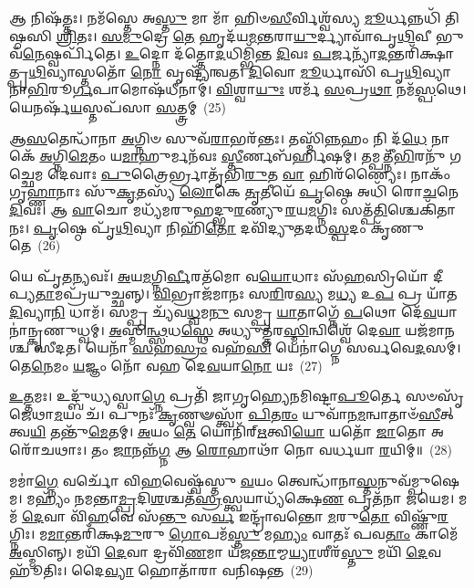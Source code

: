 𑌆 𑌨𑌿𑌷᳴𑌤𑍍𑌤𑌃। 𑌨𑌮᳴𑌸𑍍𑌤𑍇 𑌅\-\ul{𑌸𑍍𑌤𑍁} 𑌮𑌾 𑌮𑌾᳴ 𑌹𑌿𑍞\-\ul{𑌸𑍀}\-𑌰𑍍𑌵𑌿𑌶𑍍𑌵᳴𑌸𑍍𑌯 \ul{𑌮𑍂}\-𑌰𑍍𑌧𑌨𑍍𑌨𑌧𑌿᳴ 𑌤𑌿𑌷𑍍𑌠𑌸𑌿 \ul{𑌶𑍍𑌰𑌿}\-𑌤𑌃। \ul{𑌸}\-\-\ul{𑌮𑍁}\-𑌦𑍍𑌰𑍇 \ul{𑌤𑍇} 𑌹𑍃𑌦᳴𑌯\-\ul{𑌮}\-𑌨𑍍𑌤𑌰𑌾\-\ul{𑌯𑍁}\-𑌰𑍍𑌦𑍍𑌯𑌾𑌵𑌾᳴𑌪𑍃\-\ul{𑌥𑌿}\-𑌵𑍀 𑌭𑍁𑌵᳴\-\ul{𑌨𑍇}\-𑌷𑍍𑌵𑌰𑍍𑌪𑌿᳴𑌤𑍇। \ul{𑌉}\-𑌦𑍍𑌨𑍋 𑌦᳴𑌤𑍍𑌤𑍋\-\ul{𑌦}\-𑌧𑌿𑌮𑍍𑌭𑌿᳴𑌨𑍍𑌤 \ul{𑌦𑌿}\-𑌵𑌃 \ul{𑌪}\-𑌰𑍍𑌜𑌨𑍍𑌯𑌾᳴\-\ul{𑌦}\-𑌨𑍍𑌤𑌰𑌿᳴𑌕𑍍𑌷𑌾𑌤𑍍𑌪𑍃\-\ul{𑌥𑌿}\-𑌵𑍍𑌯𑌾𑌸𑍍𑌤𑌤𑍋᳴ \ul{𑌨𑍋} 𑌵𑍃𑌷𑍍𑌟𑍍𑌯𑌾᳴𑌵𑌤। \ul{𑌦𑌿}\-𑌵𑍋 \ul{𑌮𑍂}\-𑌰𑍍𑌧𑌾𑌸𑌿᳴ 𑌪𑍃\-\ul{𑌥𑌿}\-𑌵𑍍𑌯𑌾 𑌨𑌾\-\ul{𑌭𑌿}\-𑌰𑍂\-\ul{𑌰𑍍𑌗}\-𑌪𑌾𑌮𑍋𑌷᳴𑌧𑍀𑌨𑌾𑌮𑍍। \ul{𑌵𑌿}\-𑌶𑍍𑌵𑌾\-\ul{𑌯𑍁𑌃} 𑌶𑌰𑍍𑌮᳴ \ul{𑌸}\-𑌪𑍍𑌰\-\ul{𑌥𑌾} 𑌨𑌮᳴\-\ul{𑌸𑍍𑌪}\-𑌥𑍇। 𑌯𑍇𑌨𑌰𑍍\mbox{}𑌷᳴\-\ul{𑌯}\-𑌸𑍍𑌤𑌪᳴𑌸𑌾 \ul{𑌸}\-𑌤𑍍𑌤𑍍𑌰𑌮𑍍~(25)

𑌆\-\ul{𑌸}\-𑌤𑍇𑌨𑍍𑌧𑌾᳴𑌨𑌾 \ul{𑌅}\-𑌗𑍍𑌨𑌿𑍞 𑌸𑍁𑌵᳴\-\ul{𑌰𑌾}\-𑌭𑌰᳴𑌨𑍍𑌤𑌃। 𑌤𑌸𑍍𑌮𑌿᳴\-\ul{𑌨𑍍𑌨}\-𑌹𑌂 𑌨𑌿 𑌦᳴\-\ul{𑌧𑍇} 𑌨𑌾𑌕𑍇᳴ \ul{𑌅}\-𑌗𑍍𑌨𑌿\-\ul{𑌮𑍇}\-𑌤𑌂 𑌯\-\ul{𑌮𑌾}\-𑌹𑍁𑌰𑍍𑌮𑌨᳴𑌵𑌃 \ul{𑌸𑍍𑌤𑍀}\-𑌰𑍍𑌣𑌬᳴𑌰𑍍\mbox{}𑌹𑌿𑌷𑌮𑍍। 𑌤𑌮𑍍𑌪𑌤𑍍𑌨𑍀᳴\-\ul{𑌭𑌿}\-𑌰𑌨𑍁᳴ 𑌗𑌚𑍍𑌛𑍇𑌮 𑌦𑍇𑌵𑌾𑌃 \ul{𑌪𑍁}\-𑌤𑍍𑌰𑍈𑌰𑍍𑌭𑍍𑌰𑌾𑌤𑍃᳴𑌭𑌿\-\ul{𑌰𑍁}\-𑌤 \ul{𑌵𑌾} 𑌹𑌿𑌰᳴𑌣𑍍𑌯𑍈𑌃। 𑌨𑌾𑌕𑌂᳴ 𑌗𑍃\-\ul{𑌹𑍍𑌣𑌾}\-𑌨𑌾𑌃 𑌸𑍁᳴\-\ul{𑌕𑍃}\-𑌤𑌸𑍍𑌯᳴ \ul{𑌲𑍋}\-𑌕𑍇 \ul{𑌤𑍃}\-𑌤𑍀𑌯𑍇᳴ \ul{𑌪𑍃}\-𑌷𑍍𑌠𑍇 𑌅𑌧𑌿᳴ 𑌰𑍋\-\ul{𑌚}\-𑌨𑍇 \ul{𑌦𑌿}\-𑌵𑌃। 𑌆 \ul{𑌵𑌾}\-𑌚𑍋 𑌮𑌧𑍍𑌯᳴𑌮𑌰𑍁𑌹𑌦𑍍𑌭𑍁\-\ul{𑌰}\-𑌣𑍍𑌯𑍁\-\ul{𑌰}\-𑌯\-\ul{𑌮}\-𑌗𑍍𑌨𑌿𑌃 𑌸𑌤𑍍𑌪᳴\-\ul{𑌤𑌿}\-𑌶𑍍𑌚𑍇𑌕𑌿᳴𑌤𑌾𑌨𑌃। \ul{𑌪𑍃}\-𑌷𑍍𑌠𑍇 𑌪𑍃᳴\-\ul{𑌥𑌿}\-𑌵𑍍𑌯𑌾 𑌨𑌿𑌹𑌿᳴\-\ul{𑌤𑍋} 𑌦𑌵𑌿᳴𑌦𑍍𑌯𑍁𑌤𑌦𑌧\-\ul{𑌸𑍍𑌪}\-𑌦𑌂 𑌕𑍃᳴𑌣𑍁𑌤𑍇~(26)

𑌯𑍇 𑌪𑍃᳴\-\ul{𑌤}\-𑌨𑍍𑌯𑌵𑌃᳴। \ul{𑌅}\-𑌯\-\ul{𑌮}\-𑌗𑍍𑌨𑌿\-\ul{𑌰𑍍𑌵𑍀}\-𑌰𑌤᳴𑌮𑍋 𑌵\-\ul{𑌯𑍋}\-𑌧𑌾𑌃 𑌸᳴\-\ul{𑌹}\-𑌸𑍍𑌰𑌿𑌯𑍋᳴ 𑌦𑍀𑌪𑍍𑌯\-\ul{𑌤𑌾}\-𑌮𑌪𑍍𑌰᳴𑌯𑍁𑌚𑍍𑌛𑌨𑍍𑌨𑍍। \ul{𑌵𑌿}\-𑌭𑍍𑌰𑌾𑌜᳴𑌮𑌾𑌨𑌃 𑌸\-\ul{𑌰𑌿}\-𑌰\-\ul{𑌸𑍍𑌯} 𑌮\-\ul{𑌧𑍍𑌯} 𑌉\-\ul{𑌪} 𑌪𑍍𑌰 𑌯𑌾᳴𑌤 \ul{𑌦𑌿}\-𑌵𑍍𑌯𑌾\-\ul{𑌨𑌿} 𑌧𑌾𑌮᳴। 𑌸𑌮𑍍𑌪𑍍𑌰 𑌚𑍍𑌯᳴𑌵\-\ul{𑌧𑍍𑌵}\-𑌮\-\ul{𑌨𑍁} 𑌸𑌮𑍍𑌪𑍍𑌰 \ul{𑌯𑌾}\-𑌤𑌾𑌗𑍍𑌨𑍇᳴ \ul{𑌪}\-𑌥𑍋 𑌦𑍇᳴\-\ul{𑌵}\-𑌯𑌾𑌨𑌾॑𑌨𑍍𑌕𑍃𑌣𑍁𑌧𑍍𑌵𑌮𑍍। \ul{𑌅}\-𑌸𑍍𑌮𑌿\-\ul{𑌨𑍍𑌥𑍍𑌸}\-𑌧\-\ul{𑌸𑍍𑌥𑍇} 𑌅𑌧𑍍𑌯𑍁𑌤𑍍𑌤᳴𑌰\-\ul{𑌸𑍍𑌮𑌿}\-𑌨𑍍𑌵𑌿𑌶𑍍𑌵𑍇᳴ 𑌦𑍇\-\ul{𑌵𑌾} 𑌯𑌜᳴𑌮𑌾𑌨𑌶𑍍𑌚 𑌸𑍀𑌦𑌤। 𑌯𑍇𑌨𑌾᳴ \ul{𑌸}\-𑌹\-\ul{𑌸𑍍𑌰𑌂} 𑌵𑌹᳴\-\ul{𑌸𑌿} 𑌯𑍇𑌨𑌾॑𑌗𑍍𑌨𑍇 𑌸𑌰𑍍𑌵𑌵𑍇\-\ul{𑌦}\-𑌸𑌮𑍍। 𑌤𑍇\-\ul{𑌨𑍇}\-𑌮𑌂 \ul{𑌯}\-𑌜𑍍𑌞𑌂 𑌨𑍋᳴ 𑌵𑌹 𑌦𑍇\-\ul{𑌵}\-𑌯𑌾\-\ul{𑌨𑍋} 𑌯𑌃~(27)

\-\ul{𑌉}\-\-\ul{𑌤𑍍𑌤}\-𑌮𑌃। 𑌉𑌦𑍍𑌬𑍁᳴𑌧𑍍𑌯𑌸𑍍𑌵𑌾\-\ul{𑌗𑍍𑌨𑍇} 𑌪𑍍𑌰𑌤𑌿᳴ 𑌜𑌾𑌗𑍃𑌹𑍍𑌯𑍇𑌨𑌮𑌿𑌷𑍍𑌟𑌾\-\ul{𑌪𑍂}\-𑌰𑍍𑌤𑍇 𑌸𑍞𑌸𑍃᳴𑌜𑍇𑌥𑌾\-\ul{𑌮}\-𑌯𑌂 𑌚᳴। 𑌪𑍁𑌨𑌃᳴ \ul{𑌕𑍃}\-𑌣𑍍𑌵𑍟𑌸𑍍𑌤𑍍𑌵𑌾᳴ \ul{𑌪𑌿}\-𑌤\-\ul{𑌰𑌂} 𑌯𑍁𑌵𑌾᳴𑌨\-\ul{𑌮}\-𑌨𑍍𑌵𑌾𑌤𑌾𑍞᳴\-\ul{𑌸𑍀}\-𑌤𑍍 𑌤𑍍𑌵\-\ul{𑌯𑌿} 𑌤𑌨𑍍𑌤𑍁᳴\-\ul{𑌮𑍇}\-𑌤𑌮𑍍। \ul{𑌅}\-𑌯𑌂 \ul{𑌤𑍇} 𑌯𑍋𑌨𑌿᳴𑌰𑍍\mbox{}\-\ul{𑌋}\-𑌤𑍍𑌵𑌿\-\ul{𑌯𑍋} 𑌯𑌤𑍋᳴ \ul{𑌜𑌾}\-𑌤𑍋 𑌅𑌰𑍋᳴𑌚𑌥𑌾𑌃। 𑌤𑌂 \ul{𑌜𑌾}\-𑌨𑌨𑍍𑌨᳴\-\ul{𑌗𑍍𑌨} 𑌆 \ul{𑌰𑍋}\-𑌹𑌾𑌥𑌾᳴ 𑌨𑍋 𑌵𑌰𑍍𑌧𑌯𑌾 \ul{𑌰}\-𑌯𑌿𑌮𑍍॥~(28)

{\anuvakamend[{\-\ul{𑌧𑍍𑌰𑍁}\-𑌵𑌃 \ul{𑌸}\-𑌤𑍍𑌰𑌂 𑌕𑍃᳴𑌣𑍁\-\ul{𑌤𑍇} 𑌯𑌃 \ul{𑌸}\-𑌪𑍍𑌤𑌤𑍍𑌰𑌿𑍞᳴𑌶𑌚𑍍𑌚}]}%

𑌮𑌮𑌾॑\-\ul{𑌗𑍍𑌨𑍇} 𑌵𑌰𑍍𑌚𑍋᳴ 𑌵𑌿\-\ul{𑌹}\-𑌵𑍇𑌷𑍍𑌵᳴𑌸𑍍𑌤𑍁 \ul{𑌵}\-𑌯𑌂 𑌤𑍍𑌵𑍇𑌨𑍍𑌧𑌾᳴𑌨𑌾\-\ul{𑌸𑍍𑌤}\-𑌨𑍁𑌵᳴𑌮𑍍𑌪𑍁𑌷𑍇𑌮। 𑌮𑌹𑍍𑌯𑌂᳴ 𑌨𑌮𑌨𑍍𑌤𑌾\-\ul{𑌮𑍍𑌪𑍍𑌰}\-𑌦𑌿\-\ul{𑌶}\-𑌶𑍍𑌚𑌤᳴\-\ul{𑌸𑍍𑌰}\-𑌸𑍍𑌤𑍍𑌵𑌯𑌾𑌧𑍍𑌯᳴𑌕𑍍𑌷𑍇\-\ul{𑌣} 𑌪𑍃𑌤᳴𑌨𑌾 𑌜𑌯𑍇𑌮। 𑌮𑌮᳴ \ul{𑌦𑍇}\-𑌵𑌾 𑌵𑌿᳴\-\ul{𑌹}\-𑌵𑍇 𑌸᳴\-\ul{𑌨𑍍𑌤𑍁} 𑌸\-\ul{𑌰𑍍𑌵} 𑌇𑌨𑍍𑌦𑍍𑌰𑌾᳴𑌵𑌨𑍍𑌤𑍋 \ul{𑌮}\-𑌰𑍁\-\ul{𑌤𑍋} 𑌵𑌿𑌷𑍍𑌣𑍁᳴\-\ul{𑌰}\-𑌗𑍍𑌨𑌿𑌃। 𑌮\-\ul{𑌮𑌾}\-𑌨𑍍𑌤𑌰𑌿᳴𑌕𑍍𑌷\-\ul{𑌮𑍁}\-𑌰𑍁 \ul{𑌗𑍋}\-𑌪𑌮᳴\-\ul{𑌸𑍍𑌤𑍁} 𑌮\-\ul{𑌹𑍍𑌯𑌂} 𑌵𑌾𑌤𑌃᳴ 𑌪𑌵\-\ul{𑌤𑌾𑌂} 𑌕𑌾𑌮𑍇᳴ \ul{𑌅}\-𑌸𑍍𑌮𑌿𑌨𑍍𑌨𑍍। 𑌮𑌯𑌿᳴ \ul{𑌦𑍇}\-𑌵𑌾 𑌦𑍍𑌰𑌵𑌿᳴\-\ul{𑌣}\-𑌮𑌾 𑌯᳴𑌜\-\ul{𑌨𑍍𑌤𑌾}\-𑌮𑍍𑌮\-\ul{𑌯𑍍𑌯𑌾}\-𑌶𑍀𑌰᳴\-\ul{𑌸𑍍𑌤𑍁} 𑌮𑌯𑌿᳴ \ul{𑌦𑍇}\-𑌵𑌹𑍂᳴𑌤𑌿𑌃। 𑌦𑍈\-\ul{𑌵𑍍𑌯𑌾} 𑌹𑍋𑌤𑌾᳴𑌰𑌾 𑌵𑌨𑌿𑌷𑌨𑍍𑌤~(29)

